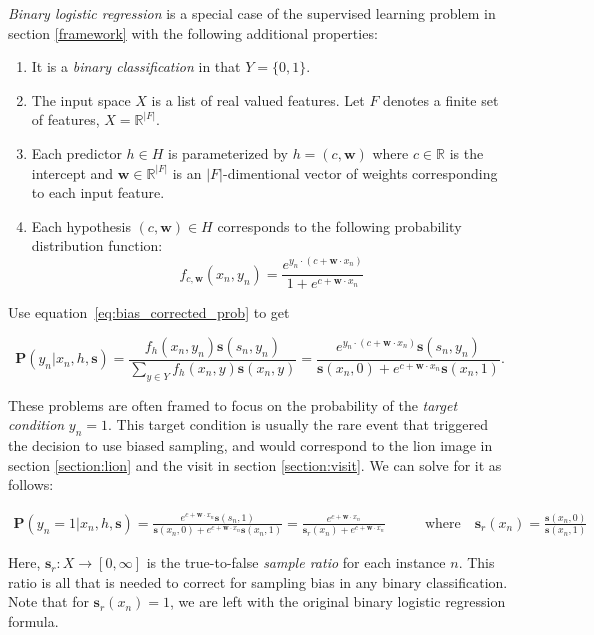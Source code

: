 \documentclass[twoside]{article}
\begin{document}
\textit{Binary logistic regression} is a special case of the supervised learning problem in section \ref{framework} with the following additional properties:

\begin{enumerate}
	\item It is a \textit{binary classification} in that \(Y = \{0, 1\}\).
	\item The input space \(X\) is a list of real valued features. Let \(F\) denotes a finite set of features, \(X = \mathbb{R} ^{|F|}\).
	\item Each predictor \(h \in H\) is parameterized by \(h = (c, \mathbf{w})\) where \(c \in \mathbb{R}\) is the intercept and \(\mathbf{w} \in \mathbb{R}^{|F|}\) is an \(|F|\)-dimentional vector of weights corresponding to each input feature.
          \item Each hypothesis \((c, \mathbf{w}) \in H\) corresponds to the following probability distribution function:
          \[f_{c,\mathbf{w}}(x_n, y_n)=\frac{e^{y_n \cdot (c+\mathbf{w} \cdot x_n)}}{1+e^{c+\mathbf{w} \cdot x_n}}\]
\end{enumerate}

Use equation~\eqref{eq:bias_corrected_prob} to get

\[\mathbf{P}(y_n|x_n,h,\mathbf{s})=\frac{f_h(x_n,y_n)\mathbf{s}(s_n,y_n)}{\sum_{y \in Y}f_h(x_n,y)\mathbf{s}(x_n,y)}=\frac{e^{y_n \cdot (c+\mathbf{w} \cdot x_n)}\mathbf{s}(s_n,y_n)}{\mathbf{s}(x_n,0)+e^{c+\mathbf{w} \cdot x_n}\mathbf{s}(x_n,1)}.\]

These problems are often framed to focus on the probability of the \textit{target condition} \(y_n = 1\). This target condition is usually the rare event that triggered the decision to use biased sampling, and would correspond to the lion image in section \ref{section:lion} and the visit in section \ref{section:visit}. We can solve for it as follows:

\begin{align}
\mathbf{P}(y_n=1|x_n,h,\mathbf{s})=\frac{e^{c+\mathbf{w} \cdot x_n}\mathbf{s}(s_n,1)}{\mathbf{s}(x_n,0)+e^{c+\mathbf{w} \cdot x_n}\mathbf{s}(x_n,1)}=\frac{e^{c+\mathbf{w} \cdot x_n}}{\mathbf{s}_r(x_n)+e^{c+\mathbf{w} \cdot x_n}} &
\qquad \textrm{where} \quad \mathbf{s}_r(x_n)=\frac{\mathbf{s}(x_n, 0)}{\mathbf{s}(x_n, 1)}
\end{align}

Here, \(\mathbf{s}_r: X \to [0, \infty]\) is the true-to-false \textit{sample ratio} for each instance \(n\). This ratio is all that is needed to correct for sampling bias in any binary classification. Note that for \(\mathbf{s}_r(x_n)=1\), we are left with the original binary logistic regression formula.
\end{document}
